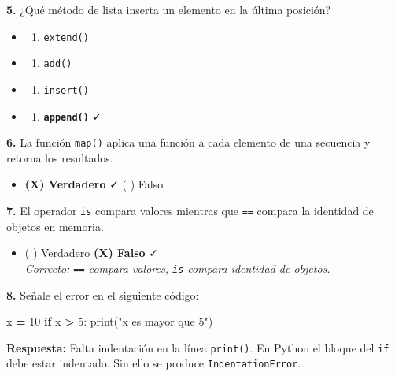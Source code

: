 \documentclass[
  9pt,
]{article}
\newenvironment{Shaded}{\begin{snugshade}}{\end{snugshade}}
\newcommand{\BuiltInTok}[1]{#1}
\newcommand{\ControlFlowTok}[1]{\textcolor[rgb]{0.13,0.29,0.53}{\textbf{#1}}}
\newcommand{\DecValTok}[1]{\textcolor[rgb]{0.00,0.00,0.81}{#1}}
\newcommand{\NormalTok}[1]{#1}
\newcommand{\OperatorTok}[1]{\textcolor[rgb]{0.81,0.36,0.00}{\textbf{#1}}}
\newcommand{\StringTok}[1]{\textcolor[rgb]{0.31,0.60,0.02}{#1}}
\providecommand{\tightlist}{%
  \setlength{\itemsep}{0pt}\setlength{\parskip}{0pt}}
\begin{document}
\textbf{5.} ¿Qué método de lista inserta un elemento en la última
posición?

\begin{itemize}
\tightlist
\item
  \begin{enumerate}
  \def\labelenumi{\Alph{enumi})}
  \tightlist
  \item
    \texttt{extend()}
  \end{enumerate}
\item
  \begin{enumerate}
  \def\labelenumi{\Alph{enumi})}
  \setcounter{enumi}{1}
  \tightlist
  \item
    \texttt{add()}
  \end{enumerate}
\item
  \begin{enumerate}
  \def\labelenumi{\Alph{enumi})}
  \setcounter{enumi}{2}
  \tightlist
  \item
    \texttt{insert()}
  \end{enumerate}
\item
  \begin{enumerate}
  \def\labelenumi{\Alph{enumi})}
  \setcounter{enumi}{3}
  \tightlist
  \item
    \textbf{\texttt{append()}} ✓
  \end{enumerate}
\end{itemize}

\textbf{6.} La función \texttt{map()} aplica una función a cada elemento
de una secuencia y retorna los resultados.

\begin{itemize}
\tightlist
\item
  \textbf{(X) Verdadero} ✓ \hspace{2cm} ( ) Falso
\end{itemize}

\textbf{7.} El operador \texttt{is} compara valores mientras que
\texttt{==} compara la identidad de objetos en memoria.

\begin{itemize}
\tightlist
\item
  ( ) Verdadero \hspace{2cm} \textbf{(X) Falso} ✓\\
  \emph{Correcto: \texttt{==} compara valores, \texttt{is} compara
  identidad de objetos.}
\end{itemize}

\textbf{8.} Señale el error en el siguiente código:

\begin{Shaded}
\begin{Highlighting}[]
\NormalTok{x }\OperatorTok{=} \DecValTok{10}
\ControlFlowTok{if}\NormalTok{ x }\OperatorTok{\textgreater{}} \DecValTok{5}\NormalTok{:}
\BuiltInTok{print}\NormalTok{(}\StringTok{"x es mayor que 5"}\NormalTok{)}
\end{Highlighting}
\end{Shaded}

\textbf{Respuesta:} Falta indentación en la línea \texttt{print()}. En
Python el bloque del \texttt{if} debe estar indentado. Sin ello se
produce \texttt{IndentationError}.
\end{document}
